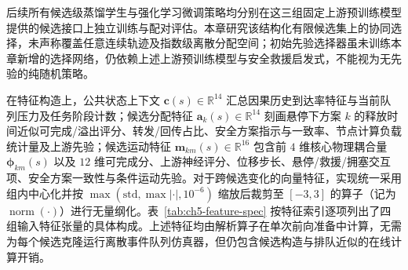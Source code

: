 后续所有候选级蒸馏学生与强化学习微调策略均分别在这三组固定上游预训练模型提供的候选接口上独立训练与配对评估。本章研究该结构化有限候选集上的协同选择，未声称覆盖任意连续轨迹及指数级离散分配空间；初始先验选择器虽未训练本章新增的选择网络，仍依赖上述上游预训练模型与安全救援启发式，不能视为无先验的纯随机策略。

在特征构造上，公共状态上下文 $\mathbf c(s)\in\mathbb R^{14}$ 汇总因果历史到达率特征与当前队列压力及任务阶段计数；候选分配特征 $\mathbf a_k(s)\in\mathbb R^{14}$ 刻画悬停下方案 $k$ 的释放时间近似可完成/溢出评分、转发/回传占比、安全方案指示与一致率、节点计算负载统计量及上游先验；候选运动特征 $\mathbf m_{km}(s)\in\mathbb R^{16}$ 包含前 $4$ 维核心物理耦合量 $\boldsymbol\phi_{km}(s)$ 以及 $12$ 维可完成分、上游神经评分、位移步长、悬停/救援/拥塞交互项、安全方案一致性与条件运动先验。对于跨候选变化的向量特征，实现统一采用组内中心化并按 $\max(\mathrm{std},\max|\cdot|,10^{-6})$ 缩放后裁剪至 $[-3,3]$ 的算子（记为 $\operatorname{norm}(\cdot)$）进行无量纲化。表~\ref{tab:ch5-feature-spec} 按特征索引逐项列出了四组输入特征张量的具体构成。上述特征均由解析算子在单次前向准备中计算，无需为每个候选克隆运行离散事件队列仿真器，但仍包含候选构造与排队近似的在线计算开销。

